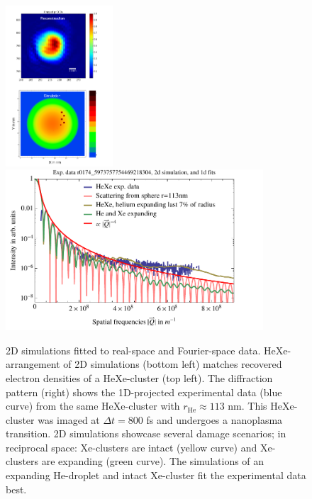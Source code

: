 \begin{figure}
	\centering
		\includegraphics[height=6.0cm]{images/results/HeXe-densities-113-05-doping-and-reconstruction.png}
		\includegraphics[height=6.0cm]{images/results/HeXe-cluster-113-0-5-doping2.pdf}
	\caption[Simulation and exp. data: Structural damage in He-droplet.]{2D simulations fitted to real-space and Fourier-space data. HeXe-arrangement of 2D simulations (bottom left) matches recovered electron densities of a HeXe-cluster (top left). The diffraction pattern (right) shows the 1D-projected experimental data (blue curve) from the same HeXe-cluster with $r_{\text{He}}\approx 113$ nm. This HeXe-cluster was imaged at $\Delta t=800$ fs and undergoes a nanoplasma transition. 2D simulations showcase several damage scenarios; in reciprocal space: Xe-clusters are intact (yellow curve) and Xe-clusters are expanding (green curve). The simulations of an expanding He-droplet and intact Xe-cluster fit the experimental data best.}
	\label{fig:HeXe-cluster-113-0.5}
\end{figure}
